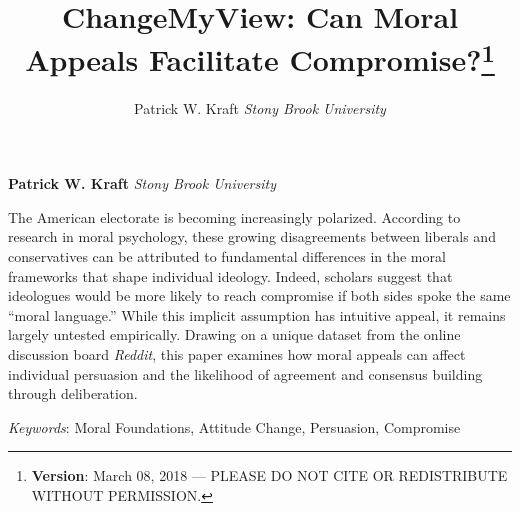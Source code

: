 \documentclass[12pt,]{article}
\title{ChangeMyView: Can Moral Appeals Facilitate Compromise?\thanks{\textbf{Version}: March 08, 2018 --- PLEASE DO NOT CITE OR REDISTRIBUTE
WITHOUT PERMISSION.}  }
\author{\Large Patrick W. Kraft\vspace{0.05in} \newline\normalsize\emph{Stony Brook University}  }
\date{}
\newcommand*{\authorfont}{\fontfamily{phv}\selectfont}
\renewenvironment{abstract}
 {{%
    \setlength{\leftmargin}{0mm}
    \setlength{\rightmargin}{\leftmargin}%
  }%
  \relax}
 {\endlist}
\begin{document}
	
%

{%
\setlength{\parindent}{0pt}
\thispagestyle{plain}
{\fontsize{18}{20}\selectfont\raggedright 
\maketitle  %

}

{
   \vskip 13.5pt\relax \normalsize\fontsize{11}{12} 
\textbf{\authorfont Patrick W. Kraft} \hskip 15pt \emph{\small Stony Brook University}   

}

}








\begin{abstract}

    \hbox{\vrule height .2pt width 39.14pc}

    \vskip 8.5pt %

\noindent The American electorate is becoming increasingly polarized. According to
research in moral psychology, these growing disagreements between
liberals and conservatives can be attributed to fundamental differences
in the moral frameworks that shape individual ideology. Indeed, scholars
suggest that ideologues would be more likely to reach compromise if both
sides spoke the same ``moral language.'' While this implicit assumption
has intuitive appeal, it remains largely untested empirically. Drawing
on a unique dataset from the online discussion board \emph{Reddit}, this
paper examines how moral appeals can affect individual persuasion and
the likelihood of agreement and consensus building through deliberation.


\vskip 8.5pt \noindent \emph{Keywords}: Moral Foundations, Attitude Change, Persuasion, Compromise \par

    \hbox{\vrule height .2pt width 39.14pc}



\end{abstract}


\vskip 6.5pt
\end{document}
